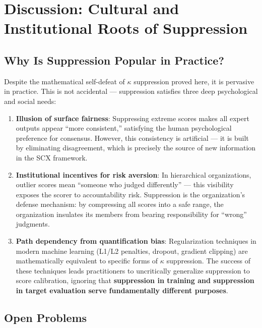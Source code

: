 \documentclass[12pt,a4paper]{article}
\theoremstyle{definition}
\begin{document}
\section{Discussion: Cultural and Institutional Roots of Suppression}
\label{sec:discussion}

\subsection{Why Is Suppression Popular in Practice?}

Despite the mathematical self-defeat of $\kappa$ suppression proved here, it is pervasive in practice. This is not accidental --- suppression satisfies three deep psychological and social needs:

\begin{enumerate}[label=(\arabic*)]
    \item \textbf{Illusion of surface fairness}: Suppressing extreme scores makes all expert outputs appear ``more consistent,'' satisfying the human psychological preference for consensus. However, this consistency is artificial --- it is built by eliminating disagreement, which is precisely the source of new information in the SCX framework.
    \item \textbf{Institutional incentives for risk aversion}: In hierarchical organizations, outlier scores mean ``someone who judged differently'' --- this visibility exposes the scorer to accountability risk. Suppression is the organization's defense mechanism: by compressing all scores into a safe range, the organization insulates its members from bearing responsibility for ``wrong'' judgments.
    \item \textbf{Path dependency from quantification bias}: Regularization techniques in modern machine learning (L1/L2 penalties, dropout, gradient clipping) are mathematically equivalent to specific forms of $\kappa$ suppression. The success of these techniques leads practitioners to uncritically generalize suppression to score calibration, ignoring that \textbf{suppression in training and suppression in target evaluation serve fundamentally different purposes}.
\end{enumerate}

\subsection{Open Problems}
\end{document}
